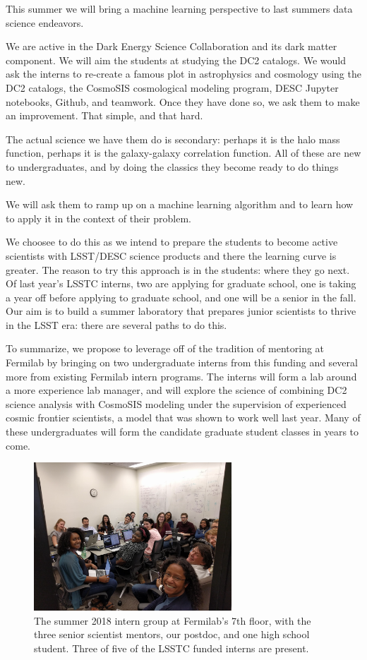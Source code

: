 This summer we will bring a machine learning perspective to last summers
data science endeavors. 

\newpage

We are active in the Dark Energy Science Collaboration and its dark matter component.
We will aim the students at studying the DC2 catalogs. We would ask
the interns to re-create a famous plot in astrophysics and cosmology using
the DC2 catalogs, the CosmoSIS cosmological modeling program,
DESC Jupyter notebooks, Github, and teamwork. Once they have done so,
we ask them to make an improvement. That simple, and that hard.

The actual science we have them do is secondary: perhaps it is the
halo mass function, perhaps it is the galaxy-galaxy correlation function.
All of these are new to undergraduates, and by doing the classics they
become ready to do things new.

We will ask them to ramp up on a machine learning algorithm and
to learn how to apply it in the context of their problem.

We choosee to do this
as we intend to prepare the students to become active scientists
with LSST/DESC science products and there the learning curve is greater.
The reason to try this approach is in the students: where they go next.
Of last year's LSSTC interns, two are applying for graduate school,
one is taking a year off before applying to graduate school, and one
will be a senior in the fall.
Our aim is to build a summer laboratory 
that prepares junior scientists to thrive in the LSST era: there
are several paths to do this. 

To summarize, we  propose to leverage off of the tradition 
of mentoring at Fermilab by
bringing on two undergraduate interns from this funding
and several more from existing Fermilab intern programs.
The interns will form a lab around a more experience
lab manager, and will explore the science
of combining DC2 science analysis with CosmoSIS modeling
under the supervision of experienced cosmic
frontier scientists, a model that was shown to work
well last year. Many of these  undergraduates will
form the candidate graduate student classes in years to come.

\begin{figure}
  \centering
    \includegraphics[width=0.66\textwidth]{interns.png}
  \caption*{The summer 2018 intern group at Fermilab's 7th floor, with the 
three senior scientist mentors, our postdoc, and one high school student. 
Three of five of the LSSTC funded interns are present.}
\end{figure}

